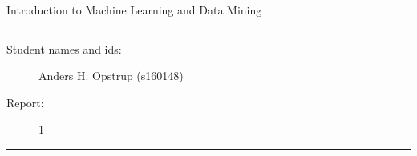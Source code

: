 \documentclass[11pt]{article}
\begin{document}
\begin{center}
{{\Large \sc Introduction to Machine Learning and Data Mining}}
\end{center}
\rule{\textwidth}{1pt}
\begin{description}
\item[Student names and ids:] Anders H. Opstrup (s160148)
\item[Report:] 1
\end{description}
\rule{\textwidth}{1pt}





\end{document}
